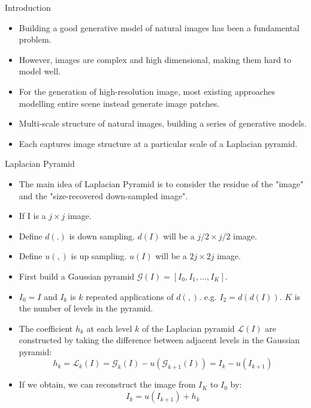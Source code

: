 \documentclass[10pt]{beamer}
\begin{document}
	\begin{frame}{Introduction}
		\begin{itemize}
			\item Building a good generative model of natural images has been a fundamental problem.
			\item However, images are complex and high dimensional, making them hard to model well.
			\item For the generation of high-resolution image, most existing approaches modelling entire scene instead generate image patches.
			\item Multi-scale structure of natural images, building a series of generative models.
			\item Each captures image structure at a particular scale of a Laplacian pyramid.
		\end{itemize}
	\end{frame}

	\begin{frame}{Laplacian Pyramid}
		\begin{itemize}
			\item The main idea of Laplacian Pyramid is to consider the residue of the "image" and the "size-recovered down-sampled image".
			\item If I is a $j\times j$ image.
			\item Define $d(.)$ is down sampling. $d(I)$ will be a $j/2\times j/2$ image.
			\item Define $u(,)$ is up sampling. $u(I)$ will be a $2j\times 2j$ image.
			\item First build a Gaussian pyramid $\mathcal{G}(I)=[I_0,I_1,\dots,I_K]$.
			\item $I_0=I$ and $I_k$ is $k$ repeated applications of $d(,)$. e.g. $I_2=d(d(I))$. $K$ is the number of levels in the pyramid.
			\item The coefficient $h_k$ at each level $k$ of the Laplacian pyramid $\mathcal{L}(I)$ are constructed by taking the difference between adjacent levels in the Gaussian pyramid:
			$$
			h_k=\mathcal{L}_k(I)=\mathcal{G}_k(I)-u(\mathcal{G}_{k+1}(I))=I_k-u(I_{k+1})
			$$
			\item If we obtain, we can reconstruct the image from $I_K$ to $I_0$ by:
			$$
			I_k=u(I_{k+1})+h_k
			$$
		\end{itemize}
	\end{frame}
\end{document}
